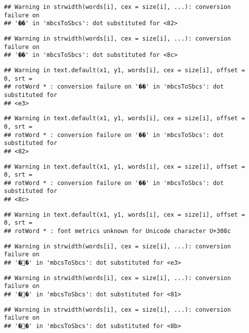 \documentclass[]{article}
\begin{document}
\begin{verbatim}
## Warning in strwidth(words[i], cex = size[i], ...): conversion failure on
## '��' in 'mbcsToSbcs': dot substituted for <82>
\end{verbatim}

\begin{verbatim}
## Warning in strwidth(words[i], cex = size[i], ...): conversion failure on
## '��' in 'mbcsToSbcs': dot substituted for <8c>
\end{verbatim}

\begin{verbatim}
## Warning in text.default(x1, y1, words[i], cex = size[i], offset = 0, srt =
## rotWord * : conversion failure on '��' in 'mbcsToSbcs': dot substituted for
## <e3>
\end{verbatim}

\begin{verbatim}
## Warning in text.default(x1, y1, words[i], cex = size[i], offset = 0, srt =
## rotWord * : conversion failure on '��' in 'mbcsToSbcs': dot substituted for
## <82>
\end{verbatim}

\begin{verbatim}
## Warning in text.default(x1, y1, words[i], cex = size[i], offset = 0, srt =
## rotWord * : conversion failure on '��' in 'mbcsToSbcs': dot substituted for
## <8c>
\end{verbatim}

\begin{verbatim}
## Warning in text.default(x1, y1, words[i], cex = size[i], offset = 0, srt =
## rotWord * : font metrics unknown for Unicode character U+308c
\end{verbatim}

\begin{verbatim}
## Warning in strwidth(words[i], cex = size[i], ...): conversion failure on
## '��' in 'mbcsToSbcs': dot substituted for <e3>
\end{verbatim}

\begin{verbatim}
## Warning in strwidth(words[i], cex = size[i], ...): conversion failure on
## '��' in 'mbcsToSbcs': dot substituted for <81>
\end{verbatim}

\begin{verbatim}
## Warning in strwidth(words[i], cex = size[i], ...): conversion failure on
## '��' in 'mbcsToSbcs': dot substituted for <8b>
\end{verbatim}
\end{document}
